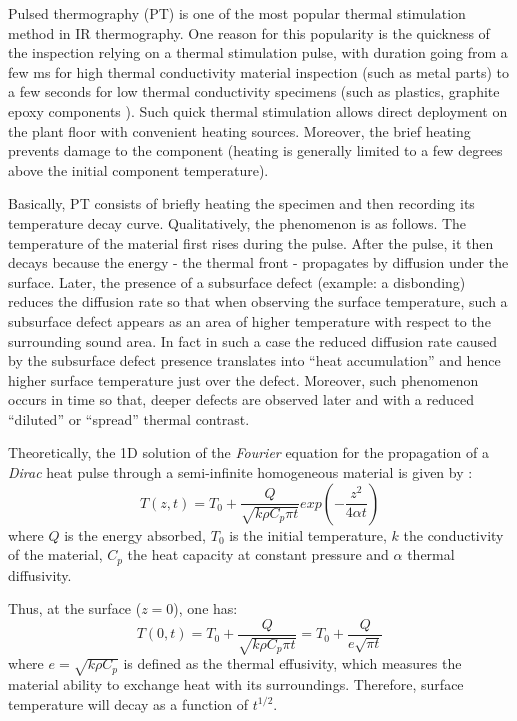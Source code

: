 Pulsed thermography (PT) is one of the most popular thermal stimulation method in IR thermography. One reason for this popularity is the quickness of the inspection relying on a thermal stimulation pulse, with duration going from a few ms for high thermal conductivity material inspection (such as metal parts) to a few seconds for low thermal conductivity specimens (such as plastics, graphite epoxy components \citep{Maldague1993Nondestructive,Maldague1994bInfra}). Such quick thermal stimulation allows direct deployment on the plant floor with convenient heating sources. Moreover, the brief heating prevents damage to the component (heating is generally limited to a few degrees above the initial component temperature).

Basically, PT consists of briefly heating the specimen and then recording its temperature decay curve. Qualitatively, the phenomenon is as follows. The temperature of the material first rises during the pulse. After the pulse, it then decays because the energy - the thermal front - propagates by diffusion under the surface. Later, the presence of a subsurface defect (example: a disbonding) reduces the diffusion rate so that when observing the surface temperature, such a subsurface defect appears as an area of higher temperature with respect to the surrounding sound area. In fact in such a case the reduced diffusion rate caused by the subsurface defect presence translates into “heat accumulation” and hence higher surface temperature just over the defect. Moreover, such phenomenon occurs in time so that, deeper defects are observed later and with a reduced “diluted” or “spread” thermal contrast.

Theoretically, the 1D solution of the \textit{Fourier} equation for the propagation of a \textit{Dirac} heat pulse through a semi-infinite homogeneous material is given by \citep{carslaw1986heat}:
\begin{equation}
T(z,t) = T_0 + \frac{Q}{\sqrt{k\rho C_p \pi t}}exp(-\frac{z^2}{4\alpha t})
\end{equation}
where $Q$ is the energy absorbed, $T_0$  is the initial temperature, $k$ the conductivity of the material, $C_p$ the heat capacity at constant pressure and $\alpha$ thermal diffusivity.

Thus, at the surface ($z=0$), one has:
\begin{equation}
T(0,t) = T_0 + \frac{Q}{\sqrt{k\rho C_p \pi t}}=T_0 + \frac{Q}{e\sqrt{\pi t}}
\end{equation}
where $e=\sqrt{k\rho C_p}$ is defined as the thermal effusivity, which measures the material ability to exchange heat with its surroundings. Therefore, surface temperature will decay as a function of $t^{1/2}$.

